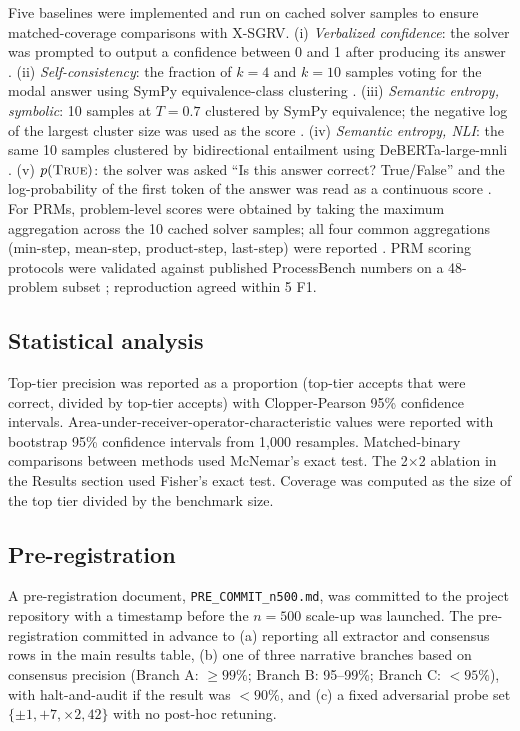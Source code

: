 \documentclass[11pt]{article}
\begin{document}
Five baselines were implemented and run on cached solver samples to ensure matched-coverage comparisons with X-SGRV. (i) \emph{Verbalized confidence}: the solver was prompted to output a confidence between 0 and 1 after producing its answer \citep{xiong2024llmuncertainty}. (ii) \emph{Self-consistency}: the fraction of $k=4$ and $k=10$ samples voting for the modal answer using SymPy equivalence-class clustering \citep{wang2023selfconsistency}. (iii) \emph{Semantic entropy, symbolic}: 10 samples at $T=0.7$ clustered by SymPy equivalence; the negative log of the largest cluster size was used as the score \citep{kuhn2023semantic}. (iv) \emph{Semantic entropy, NLI}: the same 10 samples clustered by bidirectional entailment using DeBERTa-large-mnli \citep{farquhar2024nature}. (v) \emph{$p(\textsc{True})$}: the solver was asked ``Is this answer correct? True/False'' and the log-probability of the first token of the answer was read as a continuous score \citep{kadavath2022}. For PRMs, problem-level scores were obtained by taking the maximum aggregation across the 10 cached solver samples; all four common aggregations (min-step, mean-step, product-step, last-step) were reported \citep{qwenprm2025, skyworkprm2024}. PRM scoring protocols were validated against published ProcessBench numbers on a 48-problem subset \citep{processbench2024}; reproduction agreed within 5 F1.

\subsection{Statistical analysis}

Top-tier precision was reported as a proportion (top-tier accepts that were correct, divided by top-tier accepts) with Clopper-Pearson 95\% confidence intervals. Area-under-receiver-operator-characteristic values were reported with bootstrap 95\% confidence intervals from 1{,}000 resamples. Matched-binary comparisons between methods used McNemar's exact test. The 2$\times$2 ablation in the Results section used Fisher's exact test. Coverage was computed as the size of the top tier divided by the benchmark size.

\subsection{Pre-registration}

A pre-registration document, \texttt{PRE\_COMMIT\_n500.md}, was committed to the project repository with a timestamp before the $n=500$ scale-up was launched. The pre-registration committed in advance to (a) reporting all extractor and consensus rows in the main results table, (b) one of three narrative branches based on consensus precision (Branch A: $\geq 99\%$; Branch B: 95--99\%; Branch C: $<95\%$), with halt-and-audit if the result was $<90\%$, and (c) a fixed adversarial probe set $\{\pm 1, +7, \times 2, 42\}$ with no post-hoc retuning.
\end{document}
